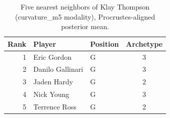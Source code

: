 \begin{table}[htbp]
  \centering\small
  \begin{tabular}{rllc}
    \toprule
    Rank & Player & Position & Archetype \\
    \midrule
    1 & Eric Gordon & G & 3 \\
    2 & Danilo Gallinari & G & 3 \\
    3 & Jaden Hardy & G & 2 \\
    4 & Nick Young & G & 3 \\
    5 & Terrence Ross & G & 2 \\
    \bottomrule
  \end{tabular}
  \caption{Five nearest neighbors of Klay Thompson (curvature_m5 modality), Procrustes-aligned posterior mean.}
  \label{tab:Klay_Thompson_neighbors_curvature_m5}
\end{table}

